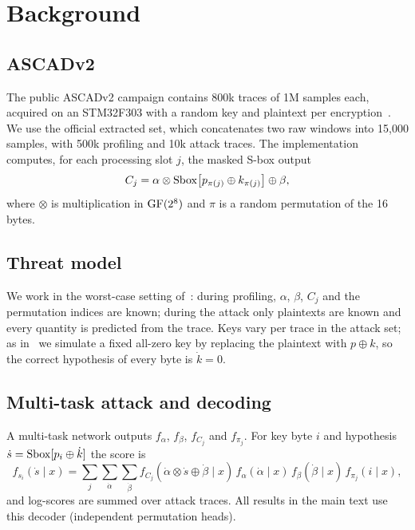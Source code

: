 \section{Background}
\label{sec:background}

\subsection{ASCADv2}
The public ASCADv2 campaign contains 800k traces of 1M samples each, acquired on an STM32F303 with
a random key and plaintext per encryption~\cite{MS23}. We use the official extracted set, which
concatenates two raw windows into 15,000 samples, with 500k profiling and 10k attack traces. The
implementation computes, for each processing slot $j$, the masked S-box output
\begin{equation}
  C_j = \alpha \otimes \mathrm{Sbox}\big[p_{\pi(j)} \oplus k_{\pi(j)}\big] \oplus \beta,
  \label{eq:masked}
\end{equation}
where $\otimes$ is multiplication in $\mathrm{GF}(2^8)$ and $\pi$ is a random permutation of the 16 bytes.

\subsection{Threat model}
We work in the worst-case setting of~\cite{MS23}: during profiling, $\alpha$, $\beta$, $C_j$ and the
permutation indices are known; during the attack only plaintexts are known and every quantity is
predicted from the trace. Keys vary per trace in the attack set; as in~\cite{MS23} we simulate a
fixed all-zero key by replacing the plaintext with $p\oplus k$, so the correct hypothesis of every byte is
$\dot k=0$.

\subsection{Multi-task attack and decoding}
A multi-task network outputs $f_\alpha$, $f_\beta$, $f_{C_j}$ and $f_{\pi_j}$. For key byte $i$
and hypothesis $\dot s=\mathrm{Sbox}[p_i\oplus \dot k]$ the score is~\cite[Eq.~12]{MS23}
\begin{equation}
  f_{s_i}(\dot s\mid x) = \sum_j \sum_{\dot\alpha}\sum_{\dot\beta}
    f_{C_j}(\dot\alpha\otimes\dot s\oplus\dot\beta\mid x)\,f_\alpha(\dot\alpha\mid x)\,
    f_\beta(\dot\beta\mid x)\,f_{\pi_j}(i\mid x),
  \label{eq:decode}
\end{equation}
and log-scores are summed over attack traces. All results in the main text use this decoder
(independent permutation heads). 

